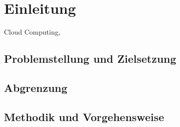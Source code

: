 \newpage
\section{Einleitung}
Cloud Computing, 
\subsection{Problemstellung und Zielsetzung}
\subsection{Abgrenzung}
\subsection{Methodik und Vorgehensweise}